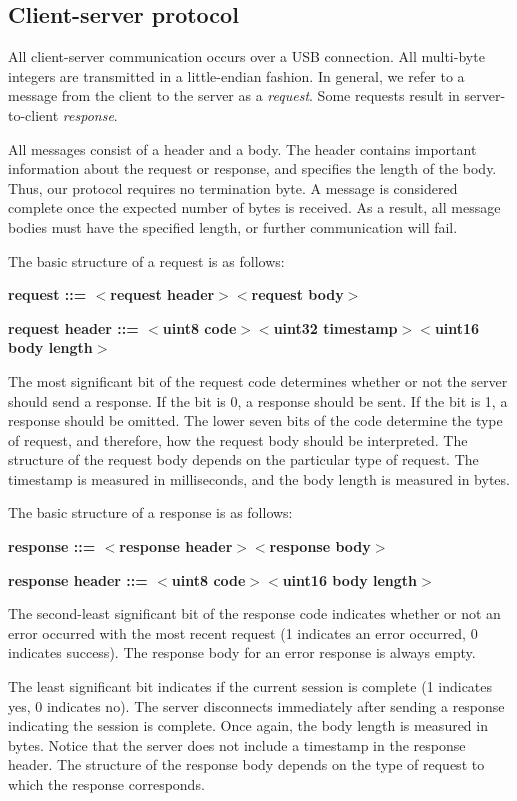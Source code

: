 \documentclass[12pt]{article}
\begin{document}
\newpage
\begin{appendices}
\section{Client-server protocol}
\label{sec:protocol}
All client-server communication occurs over a USB connection.  All multi-byte integers are transmitted in a little-endian fashion.  In general, we refer to a message from the client to the server as a \textit{request}.  Some requests result in server-to-client \textit{response}.

All messages consist of a header and a body.  The header contains important information about the request or response, and specifies the length of the body. Thus, our protocol requires no termination byte.  A message is considered complete once the expected number of bytes is received.  As a result, all message bodies must have the specified length, or further communication will fail.

The basic structure of a request is as follows:

\textbf{request ::= $<$request header$>$$<$request body$>$}

\textbf{request header ::= $<$uint8 code$>$$<$uint32 timestamp$>$$<$uint16 body length$>$}

\noindent The most significant bit of the request code determines whether or not the server should send a response.  If the bit is 0, a response should be sent.  If the bit is 1, a response should be omitted.  The lower seven bits of the code determine the type of request, and therefore, how the request body should be interpreted.  The structure of the request body depends on the particular type of request.  The timestamp is measured in milliseconds, and the body length is measured in bytes.

The basic structure of a response is as follows:

\textbf{response ::= $<$response header$>$$<$response body$>$}

\textbf{response header ::= $<$uint8 code$>$$<$uint16 body length$>$}

\noindent The second-least significant bit of the response code indicates whether or not an error occurred with the most recent request (1 indicates an error occurred, 0 indicates success).  The response body for an error response is always empty.

The least significant bit indicates if the current session is complete (1 indicates yes, 0 indicates no).  The server disconnects immediately after sending a response indicating the session is complete.  Once again, the body length is measured in bytes.  Notice that the server does not include a timestamp in the response header.  The structure of the response body depends on the type of request to which the response corresponds.


\end{appendices}
\end{document}
